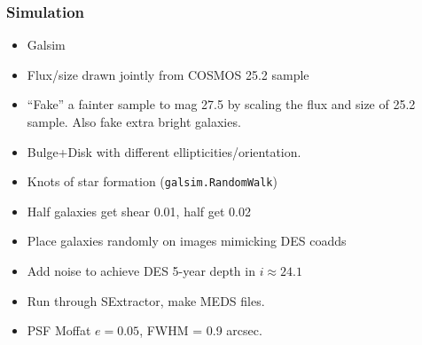 \documentclass{beamer}
\begin{document}
\frame
{

    \frametitle{Simulation}


    \begin{itemize}
        \item Galsim
        \item Flux/size drawn jointly from COSMOS 25.2 sample

        \item ``Fake'' a fainter sample to mag 27.5 by scaling
            the flux and size of 25.2 sample.  Also fake extra bright galaxies.

        \item Bulge+Disk with different ellipticities/orientation.
        \item Knots of star formation (\texttt{galsim.RandomWalk})

        \item Half galaxies get shear 0.01, half get 0.02

        \item Place galaxies randomly on images mimicking DES coadds

        \item Add noise to achieve DES 5-year depth in $i\approx 24.1$

        \item Run through SExtractor, make MEDS files.

        \item PSF Moffat $e=0.05$, FWHM = 0.9 arcsec.
    \end{itemize}

}
\end{document}
